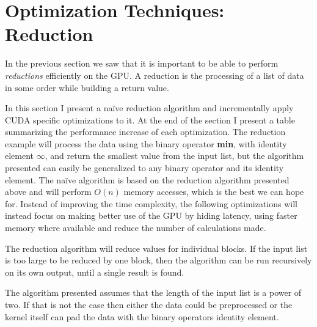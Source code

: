


\section{Optimization Techniques: Reduction}\label{sec:reduce}


In the previous section we saw that it is important to be able to perform
\textit{reductions} efficiently on the GPU. A reduction is the processing of a
list of data in some order while building a return value.


In this section I present a naïve reduction algorithm and incrementally apply
CUDA specific optimizations to it. At the end of the section I present a table
summarizing the performance increase of each optimization. The reduction example
will process the data using the binary operator \textbf{min}, with identity
element $\infty$, and return the smallest value from the input list, but the
algorithm presented can easily be generalized to any binary operator and its
identity element. The naïve algorithm is based on the reduction algorithm
presented above and will perform $O(n)$ memory accesses, which is the best we
can hope for. Instead of improving the time complexity, the following
optimizations will instead focus on making better use of the GPU by hiding
latency, using faster memory where available and reduce the number of
calculations made.


The reduction algorithm will reduce values for individual blocks. If the input
list is too large to be reduced by one block, then the algorithm can be run
recursively on its own output, until a single result is found.

The algorithm presented assumes that the length of the input list is a power of
two. If that is not the case then either the data could be preprocessed or the
kernel itself can pad the data with the binary operators identity element.

